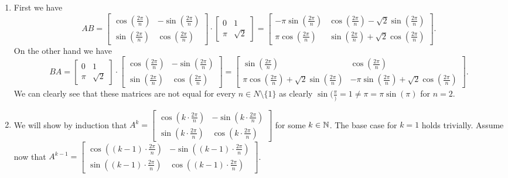 \documentclass{article}
\begin{document}
\begin{solution}
  \begin{enumerate}[label=(\alph*)]
    \item First we have
      \[AB = \begin{bmatrix} \cos(\frac{2 \pi}{n}) & -\sin(\frac{2 \pi}{n})\\ \sin(\frac{2 \pi}{n}) & \cos(\frac{2 \pi}{n}) \end{bmatrix} \cdot \begin{bmatrix} 0 & 1\\ \pi & \sqrt{2} \end{bmatrix} = \begin{bmatrix} - \pi \sin(\frac{2 \pi}{n}) & \cos(\frac{2 \pi}{n}) - \sqrt{2} \sin(\frac{2 \pi}{n})\\ \pi \cos(\frac{2 \pi}{n}) & \sin(\frac{2 \pi}{n}) + \sqrt{2} \cos(\frac{2 \pi}{n}) \end{bmatrix}.\]
      On the other hand we have
      \[BA = \begin{bmatrix} 0 & 1\\ \pi & \sqrt{2} \end{bmatrix} \cdot \begin{bmatrix} \cos(\frac{2 \pi}{n}) & -\sin(\frac{2 \pi}{n})\\ \sin(\frac{2 \pi}{n}) & \cos(\frac{2 \pi}{n}) \end{bmatrix} = \begin{bmatrix} \sin(\frac{2 \pi}{n}) & \cos(\frac{2 \pi}{n})\\ \pi \cos(\frac{2 \pi}{n}) + \sqrt{2} \sin(\frac{2 \pi}{n}) & - \pi \sin(\frac{2 \pi}{n}) + \sqrt{2} \cos(\frac{2 \pi}{n}) \end{bmatrix}.\]
        We can clearly see that these matrices are not equal for every $n \in N \setminus \{1\}$ as clearly $\sin(\frac{\pi}) = 1 \neq \pi = \pi \sin(\pi)$ for $n = 2$.
    \item We will show by induction that $A^k = \begin{bmatrix} \cos(k \cdot \frac{2 \pi}{n}) & -\sin(k \cdot \frac{2 \pi}{n})\\ \sin(k \cdot \frac{2 \pi}{n}) & \cos(k \cdot \frac{2 \pi}{n}) \end{bmatrix}$ for some $k \in \mathbb{N}$.
      The base case for $k = 1$ holds trivially.
      Assume now that $A^{k - 1} = \begin{bmatrix} \cos((k - 1) \cdot \frac{2 \pi}{n}) & -\sin((k - 1) \cdot \frac{2 \pi}{n})\\ \sin((k - 1) \cdot \frac{2 \pi}{n}) & \cos((k - 1) \cdot \frac{2 \pi}{n}) \end{bmatrix}$.

\end{enumerate}
\end{solution}
\end{document}
